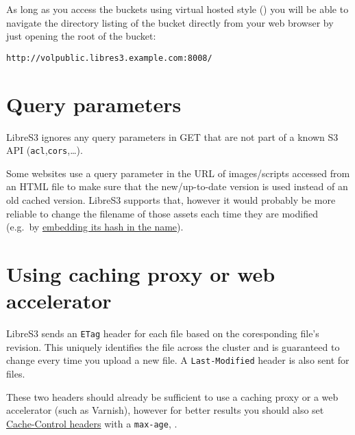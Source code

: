As long as you access the buckets using virtual hosted style () you will be able to
navigate the directory listing of the bucket directly from your web browser by
just opening the root of the bucket:
\begin{verbatim}
http://volpublic.libres3.example.com:8008/
\end{verbatim}

\section{Query parameters}

LibreS3 ignores any query parameters in GET that are not part of a known S3 API
(\verb|acl|,\verb|cors|,\ldots).

Some websites use a query parameter in the URL of images/scripts accessed from
an HTML file to make sure that the new/up-to-date version is used instead of an
old cached version. LibreS3 supports that, however it would probably be more
reliable to change the filename of those assets each time they are modified
(e.g.\ by \href{https://developers.google.com/web/fundamentals/performance/optimizing-content-efficiency/http-caching#invalidating-and-updating-cached-responses}{embedding its hash in the name}).

\section{Using caching proxy or web accelerator}

LibreS3 sends an \verb|ETag| header for each file based on the coresponding \SX file's
revision. This uniquely identifies the file across the cluster and is guaranteed
to change every time you upload a new file.
A \verb|Last-Modified| header is also sent for files.

These two headers should already be sufficient to use a caching proxy or a web
accelerator (such as Varnish), however for better results you should also set
\href{https://developers.google.com/web/fundamentals/performance/optimizing-content-efficiency/http-caching#defining-optimal-cache-control-policy}
{Cache-Control headers} with a \verb|max-age|, .
